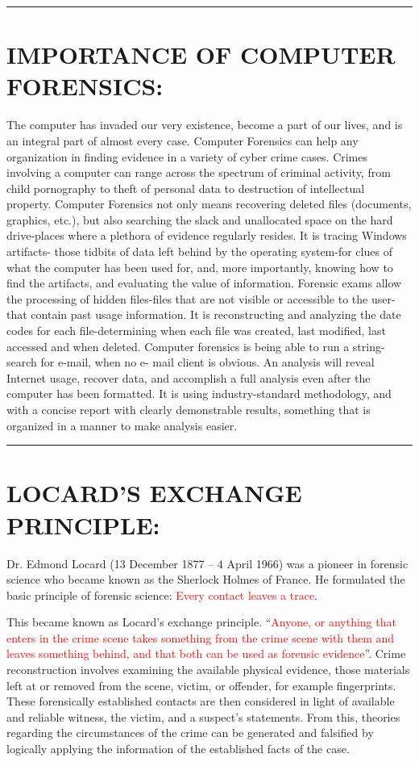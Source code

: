 \documentclass[10pt,british,english]{article}
\begin{document}
\rule[0.5ex]{1\columnwidth}{1pt}

\section{IMPORTANCE OF COMPUTER FORENSICS:}

The computer has invaded our very existence, become a part of our
lives, and is an integral part of almost every case. Computer Forensics
can help any organization in finding evidence in a variety of cyber
crime cases. Crimes involving a computer can range across the spectrum
of criminal activity, from child pornography to theft of personal
data to destruction of intellectual property. Computer Forensics not
only means recovering deleted files (documents, graphics, etc.), but
also searching the slack and unallocated space on the hard drive-places
where a plethora of evidence regularly resides. It is tracing Windows
artifacts- those tidbits of data left behind by the operating system-for
clues of what the computer has been used for, and, more importantly,
knowing how to find the artifacts, and evaluating the value of information.
Forensic exams allow the processing of hidden files-files that are
not visible or accessible to the user-that contain past usage information.
It is reconstructing and analyzing the date codes for each file-determining
when each file was created, last modified, last accessed and when
deleted. Computer forensics is being able to run a string-search for
e-mail, when no e- mail client is obvious. An analysis will reveal
Internet usage, recover data, and accomplish a full analysis even
after the computer has been formatted. It is using industry-standard
methodology, and with a concise report with clearly demonstrable results,
something that is organized in a manner to make analysis easier.

\rule[0.5ex]{1\columnwidth}{1pt}

\section{LOCARD\textquoteright S EXCHANGE PRINCIPLE:}

Dr. Edmond Locard (13 December 1877 -- 4 April 1966) was a pioneer
in forensic science who became known as the \textquotedbl Sherlock
Holmes of France\textquotedbl . He formulated the basic principle
of forensic science: \textquotedbl\textcolor{red}{Every contact
leaves a trace}\textquotedbl . 

This became known as Locard's exchange principle. \textquotedblleft \textcolor{red}{Anyone,
or anything that enters in the crime scene takes something from the
crime scene with them and leaves something behind, and that both can
be used as forensic evidence}\textquotedblright . Crime reconstruction
involves examining the available physical evidence, those materials
left at or removed from the scene, victim, or offender, for example
fingerprints. These forensically established contacts are then considered
in light of available and reliable witness, the victim, and a suspect's
statements. From this, theories regarding the circumstances of the
crime can be generated and falsified by logically applying the information
of the established facts of the case.
\end{document}

